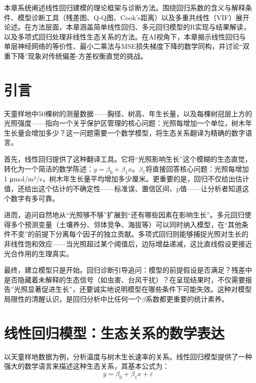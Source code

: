 \documentclass[
  twoside,12pt,fontset=none]{ctexbook}
\begin{document}
本章系统阐述线性回归建模的理论框架与诊断方法。围绕回归系数的含义与解释条件、模型诊断工具（残差图、Q-Q图、Cook's距离）以及多重共线性（VIF）展开论述。在方法层面，本章涵盖简单线性回归、多元回归模型的R实现与结果解读，以及多项式回归处理非线性生态关系的方法。在AI视角下，本章揭示线性回归与单层神经网络的等价性、最小二乘法与MSE损失梯度下降的数学同构，并讨论``双重下降''现象对传统偏差-方差权衡直觉的挑战。

\hypertarget{ux5f15ux8a00-6}{%
\section{引言}\label{ux5f15ux8a00-6}}

天童样地中50棵树的测量数据------胸径、树高、年生长量，以及每棵树冠层上方的光照强度------指向一个关乎保护区管理的核心问题：光照每增加一个单位，树木年生长量会增加多少？这一问题需要一个数学模型，将生态关系翻译为精确的数字语言。

首先，线性回归提供了这种翻译工具。它将``光照影响生长''这个模糊的生态直觉，转化为一个简洁的数学陈述：\(y = \beta_0 + \beta_1 x\)。\(\beta_1\)将直接回答核心问题：光照每增加1 μmol/m²/s，树木年生长量平均增加多少厘米。更重要的是，回归不仅给出估计值，还给出这个估计的不确定性------标准误、置信区间、p值------让分析者知道这个数字有多可靠。

进而，追问自然地从``光照够不够''扩展到``还有哪些因素在影响生长''。多元回归使得多个预测变量（土壤养分、邻体竞争、海拔等）可以同时纳入模型，在``其他条件不变''的前提下分离每个因子的独立贡献。多项式回归则能够捕捉光照对生长的非线性饱和效应------当光照超过某个阈值后，边际增益递减，这比直线假设更接近光合作用的生理真实。

最终，建立模型只是开始。回归诊断引导追问：模型的前提假设是否满足？残差中是否隐藏着未解释的生态信号（如虫害、台风干扰）？在呈现结果时，不仅需要报告''光照显著促进生长''，还要诚实地说明模型在哪些条件下可能失效。这种对模型局限性的清醒认识，是回归分析中比任何一个\(\beta\)系数都更重要的统计素养。

\hypertarget{ux7ebfux6027ux56deux5f52ux6a21ux578bux751fux6001ux5173ux7cfbux7684ux6570ux5b66ux8868ux8fbe}{%
\section{线性回归模型：生态关系的数学表达}\label{ux7ebfux6027ux56deux5f52ux6a21ux578bux751fux6001ux5173ux7cfbux7684ux6570ux5b66ux8868ux8fbe}}

以天童样地数据为例，分析温度与树木生长速率的关系。线性回归模型提供了一种强大的数学语言来描述这种生态关系，其基本公式为：\[y = \beta_0 + \beta_1 x + \varepsilon\]
\end{document}
